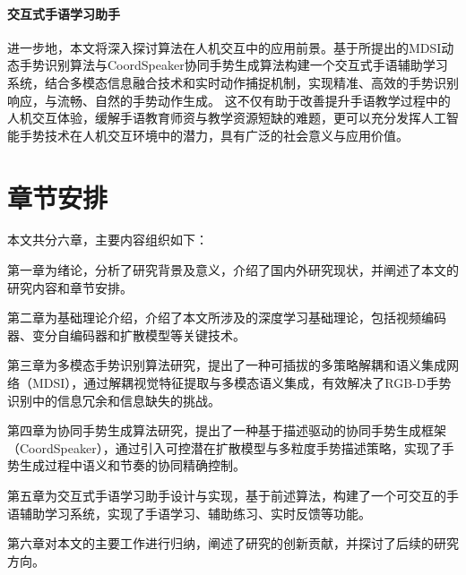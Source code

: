 \paragraph{交互式手语学习助手}
进一步地，本文将深入探讨算法在人机交互中的应用前景。基于所提出的MDSI动态手势识别算法与CoordSpeaker协同手势生成算法构建一个交互式手语辅助学习系统，结合多模态信息融合技术和实时动作捕捉机制，实现精准、高效的手势识别响应，与流畅、自然的手势动作生成。
这不仅有助于改善提升手语教学过程中的人机交互体验，缓解手语教育师资与教学资源短缺的难题\cite{2022signlearning}，更可以充分发挥人工智能手势技术在人机交互环境中的潜力，具有广泛的社会意义与应用价值。



\section{章节安排}

本文共分六章，主要内容组织如下：

第一章为绪论，分析了研究背景及意义，介绍了国内外研究现状，并阐述了本文的研究内容和章节安排。

第二章为基础理论介绍，介绍了本文所涉及的深度学习基础理论，包括视频编码器、变分自编码器和扩散模型等关键技术。

第三章为多模态手势识别算法研究，提出了一种可插拔的多策略解耦和语义集成网络（MDSI），通过解耦视觉特征提取与多模态语义集成，有效解决了RGB-D手势识别中的信息冗余和信息缺失的挑战。

第四章为协同手势生成算法研究，提出了一种基于描述驱动的协同手势生成框架（CoordSpeaker），通过引入可控潜在扩散模型与多粒度手势描述策略，实现了手势生成过程中语义和节奏的协同精确控制。

第五章为交互式手语学习助手设计与实现，基于前述算法，构建了一个可交互的手语辅助学习系统，实现了手语学习、辅助练习、实时反馈等功能。

第六章对本文的主要工作进行归纳，阐述了研究的创新贡献，并探讨了后续的研究方向。
